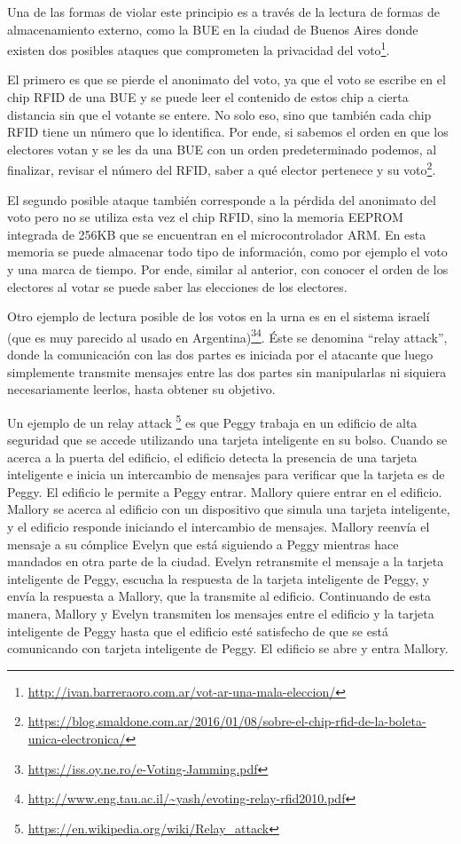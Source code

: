 Una de las formas de violar este principio es a través de la lectura de formas de almacenamiento externo, como la BUE en la ciudad de Buenos Aires donde existen dos posibles ataques que comprometen la privacidad del voto\footnote{\url{http://ivan.barreraoro.com.ar/vot-ar-una-mala-eleccion/}}.

El primero es que se pierde el anonimato del voto, ya que el voto se escribe en el chip RFID de una BUE y se puede leer el contenido de estos chip a cierta distancia sin que el votante se entere. No solo eso, sino que también cada chip RFID tiene un número que lo identifica. Por ende, si sabemos el orden en que los electores votan y se les da una BUE con un orden predeterminado podemos, al finalizar, revisar el número del RFID, saber a qué elector pertenece y su voto\footnote{\url{https://blog.smaldone.com.ar/2016/01/08/sobre-el-chip-rfid-de-la-boleta-unica-electronica/}}.

El segundo posible ataque también corresponde a la pérdida del anonimato del voto pero no se utiliza esta vez el chip RFID, sino la memoria EEPROM integrada de 256KB que se encuentran en el microcontrolador ARM. En esta memoria se puede almacenar todo tipo de información, como por ejemplo el voto y una marca de tiempo. Por ende, similar al anterior, con conocer el orden de los electores al votar se puede saber las elecciones de los electores.

Otro ejemplo de lectura posible de los votos en la urna es en el sistema israelí (que es muy parecido al usado en Argentina)\footnote{\url{https://iss.oy.ne.ro/e-Voting-Jamming.pdf}}\footnote{\url{http://www.eng.tau.ac.il/~yash/evoting-relay-rfid2010.pdf}}. Éste se denomina ``relay attack'', donde la comunicación con las dos partes es iniciada por el atacante que luego simplemente transmite mensajes entre las dos partes sin manipularlas ni siquiera necesariamente leerlos, hasta obtener su objetivo.

Un ejemplo de un relay attack
\footnote{\url{https://en.wikipedia.org/wiki/Relay_attack}}
 es que Peggy trabaja en un edificio de alta seguridad que se accede utilizando una tarjeta inteligente en su bolso. Cuando se acerca a la puerta del edificio, el edificio detecta la presencia de una tarjeta inteligente e inicia un intercambio de mensajes para verificar que la tarjeta es de Peggy. El edificio le permite a Peggy entrar. Mallory quiere entrar en el edificio. Mallory se acerca al edificio con un dispositivo que simula una tarjeta inteligente, y el edificio responde iniciando el intercambio de mensajes. Mallory reenvía el mensaje a su cómplice Evelyn que está siguiendo a Peggy mientras hace mandados en otra parte de la ciudad. Evelyn retransmite el mensaje a la tarjeta inteligente de Peggy, escucha la respuesta de la tarjeta inteligente de Peggy, y envía la respuesta a Mallory, que la transmite al edificio. Continuando de esta manera, Mallory y Evelyn transmiten los mensajes entre el edificio y la tarjeta inteligente de Peggy hasta que el edificio esté satisfecho de que se está comunicando con tarjeta inteligente de Peggy. El edificio se abre y entra Mallory.

